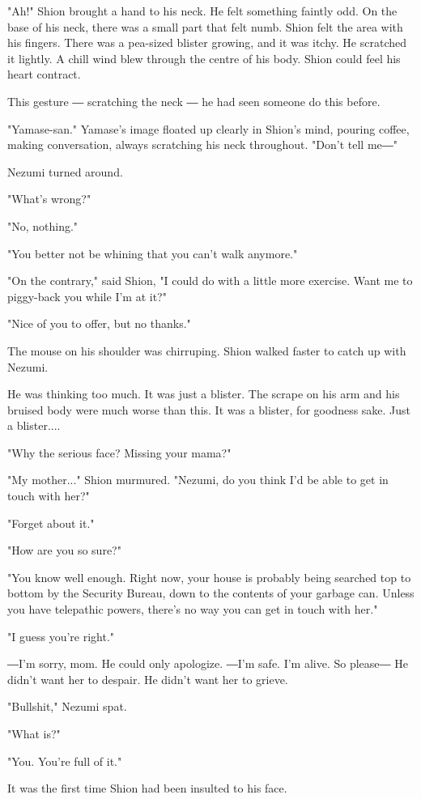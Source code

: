"Ah!" Shion brought a hand to his neck. He felt something faintly odd.
On the base of his neck, there was a small part that felt numb. Shion
felt the area with his fingers. There was a pea-sized blister growing,
and it was itchy. He scratched it lightly. A chill wind blew through the
centre of his body. Shion could feel his heart contract.

This gesture ― scratching the neck ― he had seen someone do this before.

"Yamase-san." Yamase's image floated up clearly in Shion's mind, pouring
coffee, making conversation, always scratching his neck throughout.
"Don't tell me―"

Nezumi turned around.

"What's wrong?"

"No, nothing."

"You better not be whining that you can't walk anymore."

"On the contrary," said Shion, "I could do with a little more exercise.
Want me to piggy-back you while I'm at it?"

"Nice of you to offer, but no thanks."

The mouse on his shoulder was chirruping. Shion walked faster to catch
up with Nezumi.

He was thinking too much. It was just a blister. The scrape on his arm
and his bruised body were much worse than this. It was a blister, for
goodness sake. Just a blister....

"Why the serious face? Missing your mama?"

"My mother..." Shion murmured. "Nezumi, do you think I'd be able to get
in touch with her?"

"Forget about it."

"How are you so sure?"

"You know well enough. Right now, your house is probably being searched
top to bottom by the Security Bureau, down to the contents of your
garbage can. Unless you have telepathic powers, there's no way you can
get in touch with her."

"I guess you're right."

―I'm sorry, mom. He could only apologize. ―I'm safe. I'm alive. So
please― He didn't want her to despair. He didn't want her to grieve.

"Bullshit," Nezumi spat.

"What is?"

"You. You're full of it."

It was the first time Shion had been insulted to his face.

